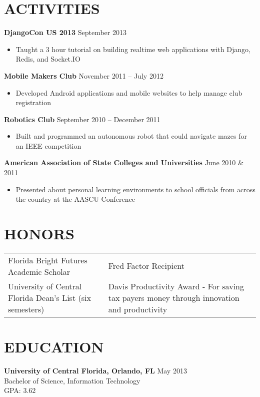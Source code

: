 \documentclass[margin]{res}
\begin{document}
\begin{resume}
\section{ACTIVITIES}
\textbf{DjangoCon US 2013} \hfill September 2013
\begin{itemize}[leftmargin=10pt]
\itemsep -2pt %
\item Taught a 3 hour tutorial on building realtime web applications with Django, Redis, and Socket.IO
\end{itemize}

\textbf{Mobile Makers Club} \hfill November 2011 -- July 2012 
\begin{itemize}[leftmargin=10pt]
\itemsep -2pt %
\item Developed Android applications and mobile websites to help manage club registration
\end{itemize}

\textbf{Robotics Club} \hfill September 2010 -- December 2011
\begin{itemize}[leftmargin=10pt]
\itemsep -2pt %
\item Built and programmed an autonomous robot that could navigate mazes for an IEEE competition
\end{itemize}

\textbf{American Association of State Colleges and Universities} \hfill June 2010 \& 2011
\begin{itemize}[leftmargin=10pt]
\itemsep -2pt %
\item Presented about personal learning environments to school officials from across the country at the AASCU Conference
\end{itemize}

\section{HONORS} 
\begin{tabular}{@{}p{2.45in} p{2.45in}}
Florida Bright Futures Academic Scholar & Fred Factor Recipient \\ [5pt]
University of Central Florida Dean's List (six semesters) & Davis Productivity Award - For saving tax payers money through innovation and productivity 
\end{tabular}

\section{EDUCATION} 
\textbf{University of Central Florida, Orlando, FL}
\hfill May 2013 \\
Bachelor of Science, Information Technology \\
GPA: 3.62 

\end{resume}
\end{document}
